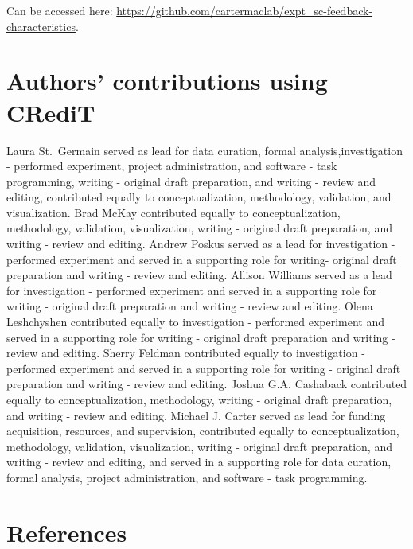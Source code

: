 \documentclass[
  doc, donotrepeattitle,floatsintext]{apa7}
\begin{document}
Can be accessed here: \url{https://github.com/cartermaclab/expt_sc-feedback-characteristics}.

\hypertarget{authors-contributions-using-credit}{%
\section{Authors' contributions using CRediT}\label{authors-contributions-using-credit}}

Laura St.~Germain served as lead for data curation, formal analysis,investigation - performed experiment, project administration, and software - task programming, writing - original draft preparation, and writing - review and editing, contributed equally to conceptualization, methodology, validation, and visualization. Brad McKay contributed equally to conceptualization, methodology, validation, visualization, writing - original draft preparation, and writing - review and editing. Andrew Poskus served as a lead for investigation - performed experiment and served in a supporting role for writing- original draft preparation and writing - review and editing. Allison Williams served as a lead for investigation - performed experiment and served in a supporting role for writing - original draft preparation and writing - review and editing. Olena Leshchyshen contributed equally to investigation - performed experiment and served in a supporting role for writing - original draft preparation and writing - review and editing. Sherry Feldman contributed equally to investigation - performed experiment and served in a supporting role for writing - original draft preparation and writing - review and editing. Joshua G.A. Cashaback contributed equally to conceptualization, methodology, writing - original draft preparation, and writing - review and editing. Michael J. Carter served as lead for funding acquisition, resources, and supervision, contributed equally to conceptualization, methodology, validation, visualization, writing - original draft preparation, and writing - review and editing, and served in a supporting role for data curation, formal analysis, project administration, and software - task programming.

\hypertarget{references}{%
\section{References}\label{references}}

\vspace{2ex}
\end{document}
